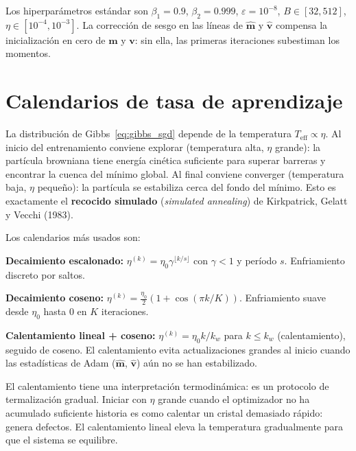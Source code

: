 Los hiperparámetros estándar son $\beta_1 = 0.9$, $\beta_2 = 0.999$,
$\varepsilon = 10^{-8}$, $B \in [32, 512]$, $\eta \in [10^{-4}, 10^{-3}]$.
La corrección de sesgo en las líneas de $\hat{\bm{m}}$ y $\hat{\bm{v}}$
compensa la inicialización en cero de $\bm{m}$ y $\bm{v}$: sin ella,
las primeras iteraciones subestiman los momentos.

\section{Calendarios de tasa de aprendizaje}
\label{sec:lr_schedule}


La distribución de Gibbs~\eqref{eq:gibbs_sgd} depende de la temperatura
$T_{\text{eff}} \propto \eta$. Al inicio del entrenamiento conviene
explorar (temperatura alta, $\eta$ grande): la partícula browniana tiene
energía cinética suficiente para superar barreras y encontrar la cuenca
del mínimo global. Al final conviene converger (temperatura baja, $\eta$
pequeño): la partícula se estabiliza cerca del fondo del mínimo. Esto es
exactamente el \textbf{recocido simulado} (\textit{simulated annealing})
de Kirkpatrick, Gelatt y Vecchi (1983).

Los calendarios más usados son:

\textbf{Decaimiento escalonado:}
$\eta^{(k)} = \eta_0 \gamma^{\lfloor k/s\rfloor}$ con $\gamma < 1$
y período $s$. Enfriamiento discreto por saltos.

\textbf{Decaimiento coseno:}
$\eta^{(k)} = \frac{\eta_0}{2}(1+\cos(\pi k/K))$. Enfriamiento suave
desde $\eta_0$ hasta $0$ en $K$ iteraciones.

\textbf{Calentamiento lineal + coseno:}
$\eta^{(k)} = \eta_0 k/k_w$ para $k \leq k_w$ (calentamiento), seguido
de coseno. El calentamiento evita actualizaciones grandes al inicio cuando
las estadísticas de Adam ($\hat{\bm{m}}$, $\hat{\bm{v}}$) aún no se han
estabilizado.

El calentamiento tiene una interpretación termodinámica: es un protocolo
de termalización gradual. Iniciar con $\eta$ grande cuando el optimizador
no ha acumulado suficiente historia es como calentar un cristal demasiado
rápido: genera defectos. El calentamiento lineal eleva la temperatura
gradualmente para que el sistema se equilibre.

